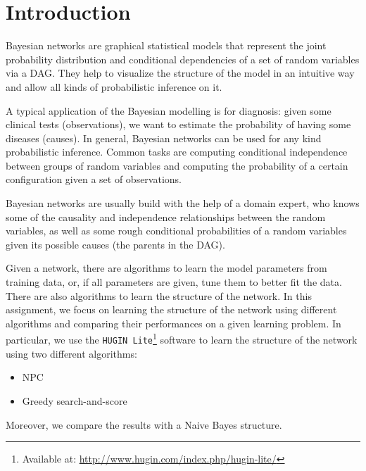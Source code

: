 \section{Introduction}
\label{sec:introduction}

Bayesian networks are graphical statistical models that represent the joint probability distribution and conditional dependencies of a set of random variables via a \ac{DAG}.
They help to visualize the structure of the model in an intuitive way and allow all kinds of probabilistic inference on it.

A typical application of the Bayesian modelling is for diagnosis: given some clinical tests (observations), we want to estimate the probability of having some diseases (causes).
In general, Bayesian networks can be used for any kind probabilistic inference.
Common tasks are computing conditional independence between groups of random variables and computing the probability of a certain configuration given a set of observations.

Bayesian networks are usually build with the help of a domain expert, who knows some of the causality and independence relationships between the random variables, as well as some rough conditional probabilities of a random variables given its possible causes (the parents in the \ac{DAG}).

Given a network, there are algorithms to learn the model parameters from training data, or, if all parameters are given, tune them to better fit the data.
There are also algorithms to learn the structure of the network.
In this assignment, we focus on learning the structure of the network using different algorithms and comparing their performances on a given learning problem.
In particular, we use the \texttt{HUGIN Lite}\footnote{Available at: \url{http://www.hugin.com/index.php/hugin-lite/}} software to learn the structure of the network using two different algorithms:
\begin{itemize}
    \item NPC
    \item Greedy search-and-score
\end{itemize}
Moreover, we compare the results with a Naive Bayes structure.
